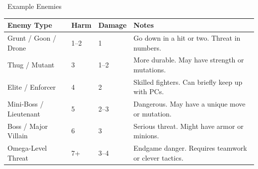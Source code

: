 \Large{}~Example Enemies\medskip\\
\normalfont\large
\begin{tabular}{|l|l|l|l|}
    \hline
    Enemy Type & Harm & Damage & Notes \\
    \hline
    Grunt / Goon / Drone & 1--2 & 1 & Go down in a hit or two. Threat in numbers. \\
    \hline
    Thug / Mutant & 3 & 1--2 & More durable. May have strength or mutations. \\
    \hline
    Elite / Enforcer & 4 & 2 & Skilled fighters. Can briefly keep up with PCs. \\
    \hline
    Mini-Boss / Lieutenant & 5 & 2--3 & Dangerous. May have a unique move or mutation. \\
    \hline
    Boss / Major Villain & 6 & 3 & Serious threat. Might have armor or minions. \\
    \hline
    Omega-Level Threat & 7+ & 3--4 & Endgame danger. Requires teamwork or clever tactics. \\
    \hline
\end{tabular}

\vfill


\newpage